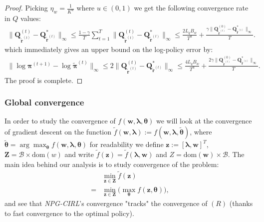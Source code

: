 \begin{proof}
Picking $\eta_{{w}}= \frac{1}{K^u}$ where $u\in (0,1)$ we get the following convergence rate in $Q$ values:
\begin{align*}
    \|\bm{Q}^{(t)}_{\tilde{\bm{r}}^{(t)}}
    - \bm{Q}^*_{\tilde{\bm{r}}^{(t)}} \|_\infty 
    \leq 
    \frac{1-\gamma}{T} \sum^{T}_{t=1}   
    \|\bm{Q}^{(t)}_{\tilde{\bm{r}}^{(t)}}
    - \bm{Q}^*_{\tilde{\bm{r}}^{(t)}} \|_\infty
    \leq
    \frac{2 L_q B_w}{T^u} +
    \frac{\gamma 
    \|\bm{Q}^{(0)}_{\tilde{\bm{r}}^{(t)}}
    - \bm{Q}^*_{\tilde{\bm{r}}^{(t)}} \|_\infty
    }{T}.
 \end{align*}
which immediately gives an upper bound on the log-policy error by:
\begin{align*}
    \| \log \bm{\pi}^{(t+1)} - \log \tilde{\bm{\pi}}^{(t)} \|_\infty 
    \leq 2
    \|\bm{Q}^{(t)}_{\tilde{\bm{r}}^{(t)}}
    - \bm{Q}^*_{\tilde{\bm{r}}^{(t)}} \|_\infty 
    \leq
    \frac{4 L_q B_w}{T^u} +
    \frac{2 \gamma 
    \|\bm{Q}^{(0)}_{\tilde{\bm{r}}^{(t)}}
    - \bm{Q}^*_{\tilde{\bm{r}}^{(t)}} \|_\infty
    }{T}.
 \end{align*}
 The proof is complete.
 
\end{proof}

\subsubsection{Global convergence}
\label{sec:NPG_CIRL_global_convergence}
In order to study the convergence of $f(\bm{w},\bm{\lambda},\bm{\theta})$  we will look at the convergence of gradient descent on the function  $\tilde{f}(\bm{w},\bm{\lambda}) := f(\bm{w},\bm{\lambda},\tilde{\bm{\theta}})$, where $\tilde{\bm{\theta}} = \arg \max_{\bm{\theta}} f(\bm{w},\bm{\lambda},\bm{\theta})$ for readability we define $\bm{z} := [\bm{\lambda},\bm{w}]^T$, $\bm{Z}=\mathcal{B}\times \text{dom}(w)$ and write $\tilde{f}(\bm{z}) = \tilde{f}(\bm{\lambda},\bm{w})$ and $Z=\text{dom}(\bm{w})\times\mathcal{B}$. The main idea behind our analysis is to study convergence of the problem:
\begin{align*}
    &\min_{\bm{z}\in\bm{Z}} \tilde{f}(\bm{z}) \tag{R}\\
    =&\min_{\bm{z}\in\bm{Z}} \Big(  \max_{\bm{\theta}} {f}(\bm{z},\bm{\theta}) \Big),
\end{align*}
and see that \textit{NPG-CIRL}'s convergence "tracks" the convergence of $(R)$ (thanks to fast convergence to the optimal policy). \\

